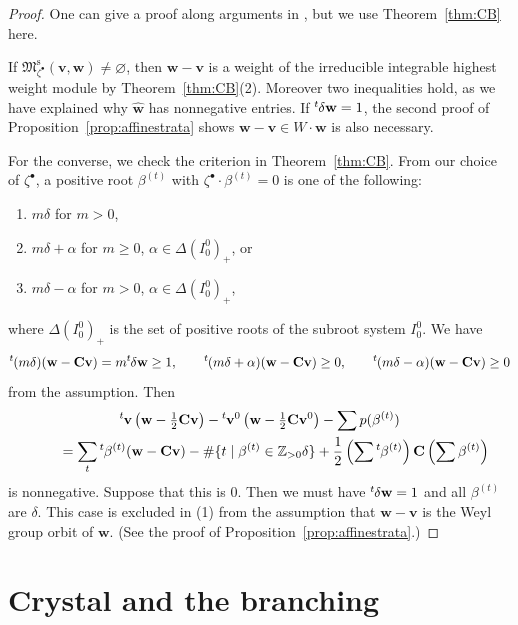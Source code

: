 \documentclass[pdftex]{sigma}
\newenvironment{aenume}{%
  \begin{enumerate}%
  \renewcommand{\theenumi}{\alph{enumi}}%
  \renewcommand{\labelenumi}{\textup{(\theenumi)}}%
  }{\end{enumerate}}
\theoremstyle{definition}
\numberwithin{equation}{section}
\newcommand{\thmref}[1]{Theorem~\ref{#1}}
\newcommand{\propref}[1]{Proposition~\ref{#1}}
\newcommand{\lsp}[2]{{\mskip-.3mu}{}^{#1}\mskip-1mu{#2}}
\newcommand{\Z}{{\mathbb Z}}
\newcommand{\M}{{\mathfrak M}} %
\newcommand{\Mreg}{\M^{\operatorname{s}}}
\newcommand{\bv}{{\mathbf v}} %
\newcommand{\bw}{{\mathbf w}} %
\newcommand{\bC}{{\mathbf C}} %
\begin{document}
\begin{proof}
One can give a proof along arguments in \cite[10.5, 10.8]{Na-alg}, but
we use \thmref{thm:CB} here.

If $\Mreg_{\zeta^\bullet}(\bv,\bw)\neq \varnothing$, then $\bw - \bv$ is
  a weight of the irreducible integrable highest weight module by
\thmref{thm:CB}(2).
Moreover two inequalities hold, as we have
  explained why $\widehat\bw$ has nonnegative entries.
%
  If $\lsp{t}{\delta}\bw = 1$, the second proof of
  \propref{prop:affinestrata} shows $\bw-\bv\in W\cdot\bw$ is also
  necessary.

  For the converse, we check the criterion in \thmref{thm:CB}. From
  our choice of $\zeta^\bullet$, a positive root $\beta^{(t)}$ with
  $\zeta^\bullet\cdot \beta^{(t)} = 0$ is one of the following:
  \begin{aenume}\itemsep=0pt
    \item $m\delta$ for $m > 0$,
    \item $m\delta + \alpha$ for $m\ge 0$, $\alpha\in
      \Delta(I_0^0)_+$, or
    \item $m\delta - \alpha$ for $m > 0$, $\alpha\in \Delta(I_0^0)_+$,
  \end{aenume}
  where $\Delta(I_0^0)_+$ is the set of positive roots of the subroot
  system $I_0^0$. We have
  \begin{equation*}
    \lsp{t}{(m\delta)} (\bw - \bC \bv) = m\lsp{t}\delta\bw \ge 1, \qquad
    \lsp{t}{(m\delta + \alpha)} (\bw - \bC \bv) \ge 0, \qquad
    \lsp{t}{(m\delta - \alpha)} (\bw - \bC \bv) \ge 0
  \end{equation*}
  from the assumption.
%
  Then
  \begin{gather*}
   \lsp{t}\bv\left(\bw - \tfrac12 \bC \bv\right)
     - \lsp{t}{\bv^0}\left(\bw - \tfrac12\bC\bv^0\right) - \sum p(\beta^{(t)})
\\
 \qquad{}    =    \sum_t \lsp{t}{\beta^{(t)}}(\bw - \bC\bv)
      - \# \{ t \mid \beta^{(t)} \in \Z_{>0}\delta\}
      + \frac12 \left(\sum \lsp{t}{\beta^{(t)}}\right) \bC
       \left(\sum {\beta^{(t)}}\right)
  \end{gather*}
  is nonnegative. Suppose that this is $0$. Then we must have
  $\lsp{t}\delta\bw = 1$ and all $\beta^{(t)}$ are $\delta$. This case
  is excluded in (1) from the assumption that $\bw - \bv$ is the Weyl
  group orbit of $\bw$. (See the proof of \propref{prop:affinestrata}.)
\end{proof}

\section{Crystal and the branching}\label{sec:crystal}
\end{document}
